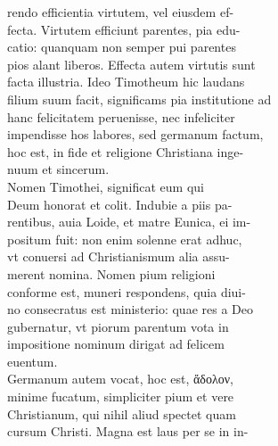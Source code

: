 \documentclass{article}
\begin{document}
\begin{pages}
                rendo efficientia virtutem, vel eiusdem ef- \\
                fecta. Virtutem efficiunt parentes, pia edu- \\
                catio: quanquam non semper pui parentes \\
                pios alant liberos. Effecta autem virtutis sunt \\
                facta illustria. Ideo Timotheum hic laudans \\
                filium suum facit, significams pia institutione ad \\
                hanc felicitatem peruenisse, nec infeliciter \\
                impendisse hos labores, sed germanum factum, \\
                hoc est, in fide et religione Christiana inge- \\
                nuum et sincerum. \\
                Nomen Timothei, significat eum qui \\
                Deum honorat et colit. Indubie a piis pa- \\
                rentibus, auia Loide, et matre Eunica, ei im- \\
                positum fuit: non enim solenne erat adhuc, \\
                vt conuersi ad Christianismum alia assu- \\
                merent nomina. Nomen pium religioni \\
                conforme est, muneri respondens, quia diui- \\
                no consecratus est ministerio: quae res a Deo \\
                gubernatur, vt piorum parentum vota in \\
                impositione nominum dirigat ad felicem \\
                euentum. \\
                Germanum autem vocat, hoc est, ἄδολον, \\
                minime fucatum, simpliciter pium et vere \\
                Christianum, qui nihil aliud spectet quam \\
                cursum Christi. Magna est laus per se in in- \\

\end{pages}
\end{document}
